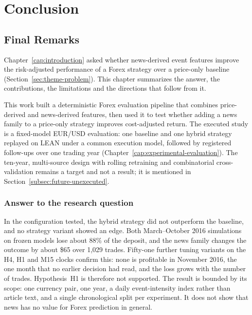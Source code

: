 \chapter{Conclusion} \label{cap:conclusion}

\section{Final Remarks} \label{sec:final-remarks}

Chapter~\ref{cap:introduction} asked whether news-derived event features improve the risk-adjusted performance of a Forex strategy over a price-only baseline (Section~\ref{sec:theme-problem}). This chapter summarizes the answer, the contributions, the limitations and the directions that follow from it.

This work built a deterministic Forex evaluation pipeline that combines price-derived and news-derived features, then used it to test whether adding a news family to a price-only strategy improves cost-adjusted return. The executed study is a fixed-model EUR/USD evaluation: one baseline and one hybrid strategy replayed on LEAN under a common execution model, followed by registered follow-ups over one trading year (Chapter~\ref{cap:experimental-evaluation}). The ten-year, multi-source design with rolling retraining and combinatorial cross-validation remains a target and not a result; it is mentioned in Section~\ref{subsec:future-unexecuted}.

\subsection{Answer to the research question} \label{subsec:answer-rq}

In the configuration tested, the hybrid strategy did not outperform the baseline, and no strategy variant showed an edge. Both March--October 2016 simulations on frozen models lose about 88\% of the deposit, and the news family changes the outcome by about \$65 over 1{,}029 trades. Fifty-one further tuning variants on the H4, H1 and M15 clocks confirm this: none is profitable in November 2016, the one month that no earlier decision had read, and the loss grows with the number of trades. Hypothesis~H1 is therefore not supported. The result is bounded by its scope: one currency pair, one year, a daily event-intensity index rather than article text, and a single chronological split per experiment. It does not show that news has no value for Forex prediction in general.

